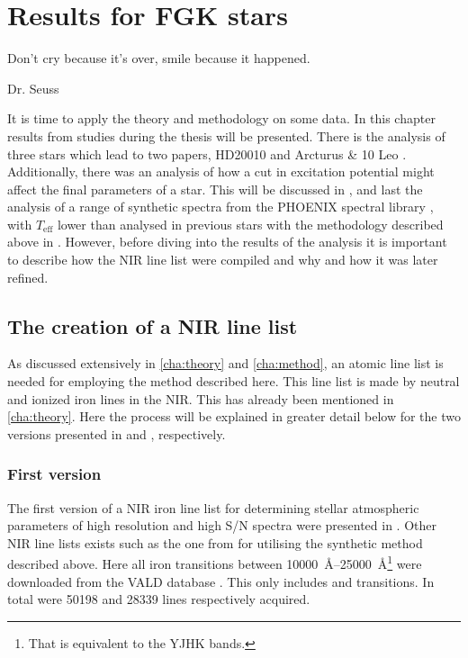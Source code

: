 \chapter{Results for FGK stars}
\label{cha:results}
\epigraph{Don't cry because it's over, smile because it happened.}{Dr. Seuss}

It is time to apply the theory and methodology on some data. In this chapter results from studies
during the thesis will be presented. There is the analysis of three stars which lead to two papers,
HD20010 \citep{Andreasen2016} and Arcturus \& 10 Leo \citep{Andreasen2017b}. Additionally, there was
an analysis of how a cut in excitation potential might affect the final parameters of a star. This
will be discussed in , and last the analysis of a range of synthetic spectra from
the PHOENIX spectral library \citep{Husser2013}, with $T_\mathrm{eff}$ lower than analysed in
previous stars with the methodology described above in . However, before diving
into the results of the analysis it is important to describe how the NIR line list were compiled and
why and how it was later refined.


\section{The creation of a NIR line list}
\label{sec:creation_line_list}

As discussed extensively in \cref{cha:theory} and \cref{cha:method}, an atomic line list is needed
for employing the method described here. This line list is made by neutral and ionized iron lines in
the NIR. This has already been mentioned in \cref{cha:theory}. Here the process will be explained in
greater detail below for the two versions presented in \citet{Andreasen2016} and
\citet{Andreasen2017a}, respectively.


\subsection{First version}
\label{sec:linelist_first}

The first version of a NIR iron line list for determining stellar atmospheric parameters of high
resolution and high S/N spectra were presented in \citet{Andreasen2016}. Other NIR line lists exists
such as the one from \citet{Onehag2012,Lindgren2016} for utilising the synthetic method described
above. Here all iron transitions between
\SIrange{10000}{25000}{\angstrom}\footnote{That is equivalent to the YJHK bands.} were downloaded
from the VALD database \citep{VALD1,VALD2}. This only includes  and 
transitions. In total were \num{50198}  and \num{28339}  lines respectively
acquired.

